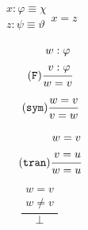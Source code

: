 \documentclass{article}
\theoremstyle{definition}
\theoremstyle{definition}
\theoremstyle{definition}
\theoremstyle{definition}
\theoremstyle{definition}
\newcommand*{\id}{\equiv}
\begin{document}
\begin{figure}[h]
\begin{subfigure}{\textwidth}
\begin{subfigure}{0.24\textwidth}
\begin{equation}
{\begin{split}
                        x: \varphi \id \chi \\
                        z: \psi \id \vartheta
                    \end{split}
                }%
                {x = z}
            \end{equation}
        \end{subfigure}
        \begin{subfigure}{0.24\textwidth}
            \begin{equation}
                \tag{\texttt{F}}
                \frac{
                    \begin{split}
                        w: \varphi \\
                        v: \varphi
                    \end{split}
                }%
                {w = v}
            \end{equation}
        \end{subfigure}
        \begin{subfigure}{0.24\textwidth}
            \begin{equation}
                \tag{\texttt{sym}}
                \frac{
                    w=v
                }%
                {v = w}
            \end{equation}
        \end{subfigure}
        \begin{subfigure}{0.24\textwidth}
            \begin{equation}
                \tag{\texttt{tran}}
                \frac{
                    \begin{split}
                        w=v\\
                        v=u
                    \end{split}
                }%
                {w = u}
            \end{equation}
        \end{subfigure}
        \begin{subfigure}{0.24\textwidth}
            \begin{equation}
                \tag{$\bot_1$}
                \frac{
                    \begin{split}
                        w=v\\
                        w \not = v
                    \end{split}
                }%
                {\bot}
            \end{equation}

\end{subfigure}
\end{subfigure}
\end{figure}
\end{document}
